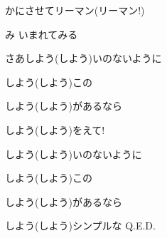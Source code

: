 \documentclass[a4paper,tate,twocolumn,12pt]{ltjtarticle}
\begin{document}
\begin{flushleft}
\begin{minipage}{\linewidth}
かにさせてリーマン(リーマン!)

み いまれてみる
\end{minipage}

\vspace{2em}

\noindent\begin{minipage}{\linewidth}
さあしよう(しよう)いのないように

しよう(しよう)この

しよう(しよう)があるなら

しよう(しよう)をえて!

しよう(しよう)いのないように

しよう(しよう)この

しよう(しよう)があるなら

しよう(しよう)シンプルな Q.E.D.
\end{minipage}

\end{flushleft}
\end{document}
